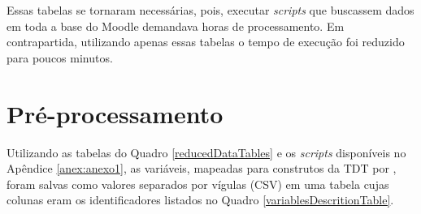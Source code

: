 
Essas tabelas se tornaram necessárias, pois, executar \textit{scripts} que
buscassem dados em toda a base do Moodle demandava horas de processamento. Em
contrapartida, utilizando apenas essas tabelas o tempo de execução foi reduzido
para poucos minutos.

\section{Pré-processamento}

Utilizando as tabelas do Quadro \ref{reducedDataTables} e os \textit{scripts}
disponíveis no Apêndice \ref{anex:anexo1}, as variáveis, mapeadas para construtos
da TDT por , foram salvas como valores separados
por vígulas (CSV) em uma tabela cujas colunas eram os identificadores listados
no Quadro \ref{variablesDescritionTable}.

